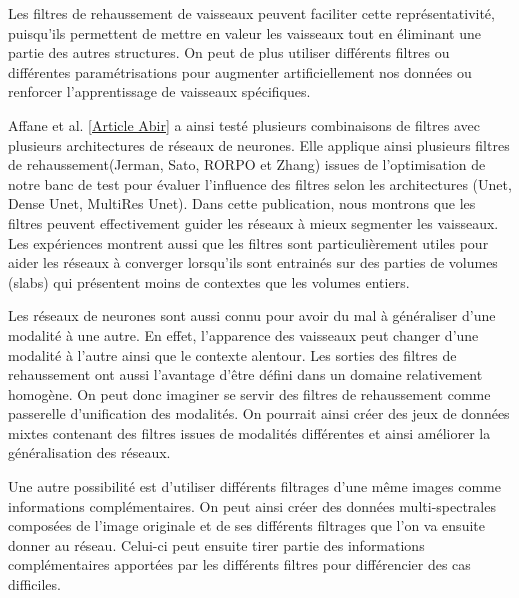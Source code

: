 Les filtres de rehaussement de vaisseaux peuvent faciliter cette représentativité, puisqu'ils permettent de mettre en valeur les vaisseaux tout en éliminant une partie des autres structures. On peut de plus utiliser différents filtres ou différentes paramétrisations pour augmenter artificiellement nos données ou renforcer l'apprentissage de vaisseaux spécifiques.

Affane et al. \ref{Article Abir} a ainsi testé plusieurs combinaisons de filtres avec plusieurs architectures de réseaux de neurones. Elle applique ainsi plusieurs filtres de rehaussement(Jerman, Sato, RORPO et Zhang) issues de l'optimisation de notre banc de test pour évaluer l'influence des filtres selon les architectures (Unet, Dense Unet, MultiRes Unet). Dans cette publication, nous montrons que les filtres peuvent effectivement guider les réseaux à mieux segmenter les vaisseaux. Les expériences montrent aussi que les filtres sont particulièrement utiles pour aider les réseaux à converger lorsqu'ils sont entrainés sur des parties de volumes (slabs) qui présentent moins de contextes que les volumes entiers.

Les réseaux de neurones sont aussi connu pour avoir du mal à généraliser d'une modalité à une autre. En effet, l'apparence des vaisseaux peut changer d'une modalité à l'autre ainsi que le contexte alentour. Les sorties des filtres de rehaussement ont aussi l'avantage d'être défini dans un domaine relativement homogène. On peut donc imaginer se servir des filtres de rehaussement comme passerelle d'unification des modalités. On pourrait ainsi créer des jeux de données mixtes contenant des filtres issues de modalités différentes et ainsi améliorer la généralisation des réseaux.

Une autre possibilité est d'utiliser différents filtrages d'une même images comme informations complémentaires. On peut ainsi créer des données multi-spectrales composées de l'image originale et de ses différents filtrages que l'on va ensuite donner au réseau. Celui-ci peut ensuite tirer partie des informations complémentaires apportées par les différents filtres pour différencier des cas difficiles.

